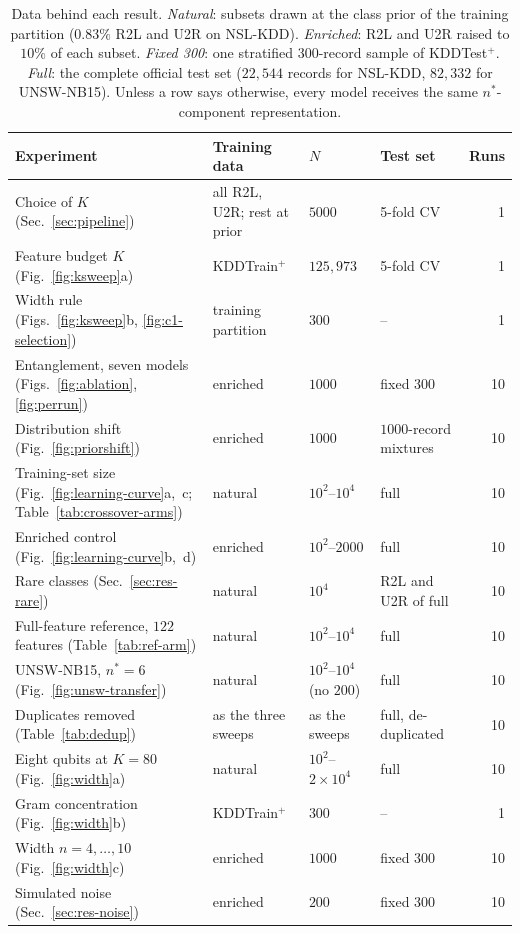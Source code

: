 \begin{table}[t]
\centering
\caption{Data behind each result. \emph{Natural}: subsets drawn at the class prior of the
training partition ($0.83\%$ R2L and U2R on NSL-KDD). \emph{Enriched}: R2L and U2R raised to
$10\%$ of each subset. \emph{Fixed 300}: one stratified $300$-record sample of KDDTest$^+$.
\emph{Full}: the complete official test set ($22{,}544$ records for NSL-KDD, $82{,}332$ for
UNSW-NB15). Unless a row says otherwise, every model receives the same $n^{\ast}$-component
representation.}
\label{tab:protocol}
\footnotesize
\setlength{\tabcolsep}{4pt}
\begin{tabular}{@{}l l l l r@{}}
\toprule
Experiment & Training data & $N$ & Test set & Runs \\
\midrule
Choice of $K$ (Sec.~\ref{sec:pipeline}) & all R2L, U2R; rest at prior & $5000$ & 5-fold CV & 1 \\
Feature budget $K$ (Fig.~\ref{fig:ksweep}a) & KDDTrain$^+$ & $125{,}973$ & 5-fold CV & 1 \\
Width rule (Figs.~\ref{fig:ksweep}b, \ref{fig:c1-selection}) & training partition & $300$ & -- & 1 \\
Entanglement, seven models (Figs.~\ref{fig:ablation}, \ref{fig:perrun}) & enriched & $1000$ & fixed 300 & 10 \\
Distribution shift (Fig.~\ref{fig:priorshift}) & enriched & $1000$ & $1000$-record mixtures & 10 \\
Training-set size (Fig.~\ref{fig:learning-curve}a,~c; Table~\ref{tab:crossover-arms}) & natural & $10^2$--$10^4$ & full & 10 \\
Enriched control (Fig.~\ref{fig:learning-curve}b,~d) & enriched & $10^2$--$2000$ & full & 10 \\
Rare classes (Sec.~\ref{sec:res-rare}) & natural & $10^4$ & R2L and U2R of full & 10 \\
Full-feature reference, $122$ features (Table~\ref{tab:ref-arm}) & natural & $10^2$--$10^4$ & full & 10 \\
UNSW-NB15, $n^{\ast}=6$ (Fig.~\ref{fig:unsw-transfer}) & natural & $10^2$--$10^4$ (no $200$) & full & 10 \\
Duplicates removed (Table~\ref{tab:dedup}) & as the three sweeps & as the sweeps & full, de-duplicated & 10 \\
Eight qubits at $K=80$ (Fig.~\ref{fig:width}a) & natural & $10^2$--$2\times10^4$ & full & 10 \\
Gram concentration (Fig.~\ref{fig:width}b) & KDDTrain$^+$ & $300$ & -- & 1 \\
Width $n=4,\dots,10$ (Fig.~\ref{fig:width}c) & enriched & $1000$ & fixed 300 & 10 \\
Simulated noise (Sec.~\ref{sec:res-noise}) & enriched & $200$ & fixed 300 & 10 \\
\bottomrule
\end{tabular}
\end{table}

